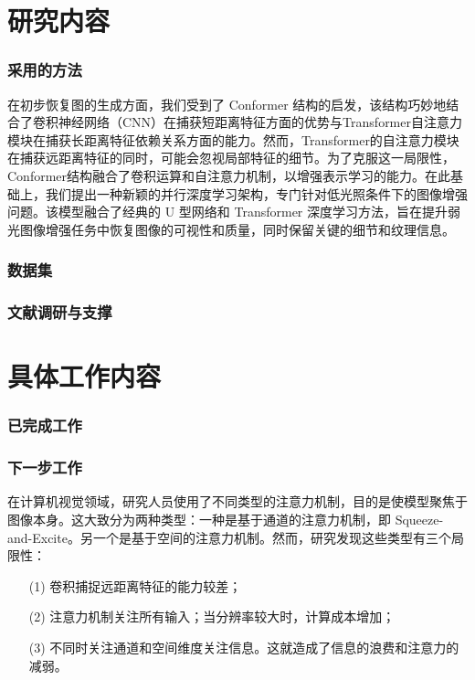 \documentclass[a4paper, 10pt]{article}
\begin{document}
	\part*{研究内容}
	
	\section{采用的方法}
	
	在初步恢复图的生成方面，我们受到了 Conformer 结构\cite{peng2021conformer}的启发，该结构巧妙地结合了卷积神经网络（CNN）在捕获短距离特征\cite{jain1991unsupervised, lowe2004distinctive, ojala2002multiresolution}方面的优势与Transformer自注意力模块在捕获长距离特征\cite{lisin2005combining}依赖关系方面的能力。然而，Transformer的自注意力模块在捕获远距离特征的同时，可能会忽视局部特征的细节。为了克服这一局限性，Conformer结构融合了卷积运算和自注意力机制，以增强表示学习的能力。在此基础上，我们提出一种新颖的并行深度学习架构，专门针对低光照条件下的图像增强问题。该模型融合了经典的 U 型网络和 Transformer 深度学习方法，旨在提升弱光图像增强任务中恢复图像的可视性和质量，同时保留关键的细节和纹理信息。
	\section{数据集}
	
	\section{文献调研与支撑}
	
	\part*{具体工作内容}
	
	\section{已完成工作}
	
	\section{下一步工作}
	
	在计算机视觉领域，研究人员使用了不同类型的注意力机制，目的是使模型聚焦于图像本身。这大致分为两种类型：一种是基于通道的注意力机制，即 Squeeze-and-Excite。另一个是基于空间的注意力机制\cite{woo2018cbam}。然而，研究发现这些类型有三个局限性：
	
	\begin{itemize}
		\item[(1)] 
		卷积捕捉远距离特征的能力较差；
		
		\item[(2)]
		注意力机制关注所有输入；当分辨率较大时，计算成本增加；
		
		\item[(3)]
		不同时关注通道和空间维度关注信息。这就造成了信息的浪费和注意力的减弱。
	\end{itemize}	
	
\end{document}
